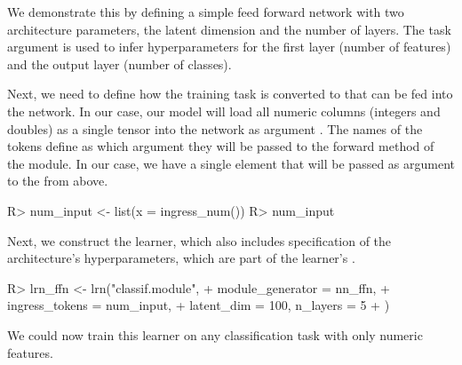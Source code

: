 \documentclass[article]{jss}
\theoremstyle{definition}
\begin{document}
We demonstrate this by defining a simple feed forward network with two architecture parameters, the latent dimension and the number of layers.
The task argument is used to infer hyperparameters for the first layer (number of features) and the output layer (number of classes).


Next, we need to define how the training task is converted to  that can be fed into the network.
In our case, our model will load all numeric columns (integers and doubles) as a single tensor into the network as argument .
The names of the tokens define as which argument they will be passed to the forward method of the module.
In our case, we have a single element  that will be passed as argument  to the  from above.

\begin{CodeInput}
R> num_input <- list(x = ingress_num())
R> num_input
\end{CodeInput}


Next, we construct the learner, which also includes specification of the architecture's hyperparameters, which are part of the learner's .

\begin{CodeInput}
R> lrn_ffn <- lrn("classif.module",
+    module_generator = nn_ffn,
+    ingress_tokens = num_input,
+    latent_dim = 100, n_layers = 5
+  )
\end{CodeInput}

We could now train this learner on any \mlrt{} classification task with only numeric features.
\end{document}
